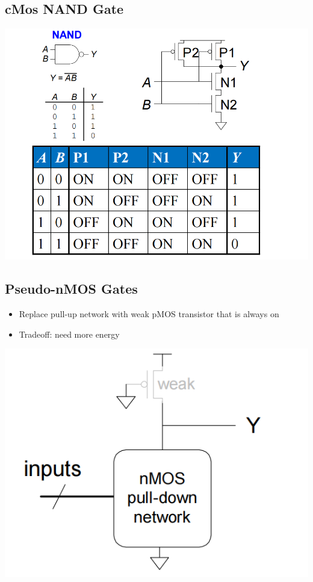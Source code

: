 \documentclass[12pt]{article}
\begin{document}
\subsection{cMos NAND Gate}
\includegraphics[width=\textwidth]{cMosNANDGate.png}
\subsection{Pseudo-nMOS Gates}
\begin{itemize}
    \item Replace pull-up network with weak pMOS transistor that is always on
    \item Tradeoff: need more energy
\end{itemize}
\includegraphics[width=\textwidth]{Pseudo-nMos.png}
\end{document}
